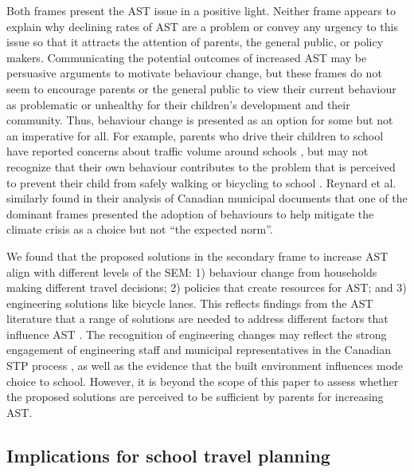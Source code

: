 \documentclass[preprint, 3p,
authoryear]{elsarticle} %
\begin{document}
Both frames present the AST issue in a positive light. Neither frame
appears to explain why declining rates of AST are a problem or convey
any urgency to this issue so that it attracts the attention of parents,
the general public, or policy makers. Communicating the potential
outcomes of increased AST may be persuasive arguments to motivate
behaviour change, but these frames do not seem to encourage parents or
the general public to view their current behaviour as problematic or
unhealthy for their children's development and their community. Thus,
behaviour change is presented as an option for some but not an
imperative for all. For example, parents who drive their children to
school have reported concerns about traffic volume around schools
\citep{mammenUnderstandingDriveEscort2012}, but may not recognize that
their own behaviour contributes to the problem that is perceived to
prevent their child from safely walking or bicycling to school
\citep{collinsSafeJourneysEnterprising2001}. Reynard et al.
\citeyearpar{reynardGrowthResilienceHow2021} similarly found in their
analysis of Canadian municipal documents that one of the dominant frames
presented the adoption of behaviours to help mitigate the climate crisis
as a choice but not ``the expected norm''.

We found that the proposed solutions in the secondary frame to increase
AST align with different levels of the SEM: 1) behaviour change from
households making different travel decisions; 2) policies that create
resources for AST; and 3) engineering solutions like bicycle lanes. This
reflects findings from the AST literature that a range of solutions are
needed to address different factors that influence AST
\citep[\emph{inter alia,
see}][]{mitraIndependentMobilityMode2013, panterAttitudesSocialSupport2010}.
The recognition of engineering changes may reflect the strong engagement
of engineering staff and municipal representatives in the Canadian STP
process
\citep{buttazzoniSupportingActiveSchool2018, mammenPuttingSchoolTravel2015},
as well as the evidence that the built environment influences mode
choice to school. However, it is beyond the scope of this paper to
assess whether the proposed solutions are perceived to be sufficient by
parents for increasing AST.

\hypertarget{implications-for-school-travel-planning}{%
\subsection{Implications for school travel
planning}\label{implications-for-school-travel-planning}}
\end{document}
